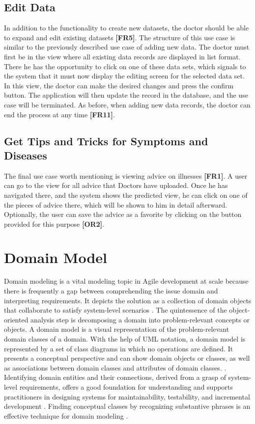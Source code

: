 \subsection{Edit Data}
In addition to the functionality to create new datasets, the doctor should be able to expand and edit existing datasets \textbf{[FR5]}. The structure of this use case is similar to the previously described use case of adding new data. The doctor must first be in the view where all existing data records are displayed in list format. There he has the opportunity to click on one of these data sets, which signals to the system that it must now display the editing screen for the selected data set. In this view, the doctor can make the desired changes and press the confirm button. The application will then update the record in the database, and the use case will be terminated. As before, when adding new data records, the doctor can end the process at any time \textbf{[FR11]}.

\subsection{Get Tips and Tricks for Symptoms and Diseases}
The final use case worth mentioning is viewing advice on illnesses \textbf{[FR1]}. A user can go to the view for all advice that Doctors have uploaded. Once he has navigated there, and the system shows the predicted view, he can click on one of the pieces of advice there, which will be shown to him in detail afterward. Optionally, the user can save the advice as a favorite by clicking on the button provided for this purpose \textbf{[OR2]}. 

\section{Domain Model}
Domain modeling is a vital modeling topic in Agile development at scale because there is frequently a gap between comprehending the issue domain and interpreting requirements. It depicts the solution as a collection of domain objects that collaborate to satisfy system-level scenarios \cite{.safe}. The quintessence of the object-oriented analysis step is decomposing a domain into problem-relevant concepts or objects. A domain model is a visual representation of the problem-relevant domain classes of a domain. With the help of UML notation, a domain model is represented by a set of class diagrams in which no operations are defined. It presents a conceptual perspective and can show domain objects or classes, as well as associations between domain classes and attributes of domain classes.\cite{.safe} \cite{.domainmodel}. Identifying domain entities and their connections, derived from a grasp of system-level requirements, offers a good foundation for understanding and supports practitioners in designing systems for maintainability, testability, and incremental development \cite{.safe}. Finding conceptual classes by recognizing substantive phrases is an effective technique for domain modeling \cite[p. 76]{.domainmodel}.


